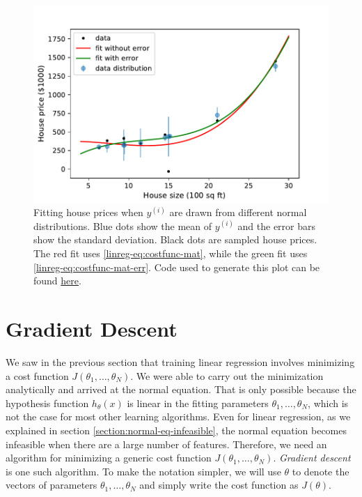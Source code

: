 \documentclass{article}
\theoremstyle{definition}
\begin{document}
\begin{figure}[ht]
\centering
\includegraphics[scale=0.7]{images/lin_reg/yerror.pdf}
\caption{Fitting house prices when $y^{(i)}$ are drawn from different normal distributions. Blue dots show the mean of $y^{(i)}$ and the error bars show the standard deviation. Black dots are sampled house prices. The red fit uses \eqref{linreg-eq:costfunc-mat}, while the green fit uses \eqref{linreg-eq:costfunc-mat-err}. Code used to generate this plot can be found \href{https://github.com/siavashaslanbeigi/ml_notes/blob/master/src/lin_reg/yerror.ipynb}{\color{blue} here}.}
\label{linreg-fig:yerror}
\end{figure}


\newpage
\section{Gradient Descent}
We saw in the previous section that training linear regression involves minimizing a cost function $J(\theta_1,\dots,\theta_N)$. We were able to carry out the minimization analytically and arrived at the normal equation. That is only possible because the hypothesis function $h_{\theta}(x)$ is linear in the fitting parameters $\theta_1,\dots,\theta_N$, which is not the case for most other learning algorithms.
Even for linear regression, as we explained in section \ref{section:normal-eq-infeasible}, the normal equation becomes infeasible when there are a large number of features. Therefore, we need an algorithm for minimizing a generic cost function $J(\theta_1,\dots,\theta_N)$. \textit{Gradient descent} is one such algorithm. To make the notation simpler, we will use $\theta$ to denote the vectors of parameters $\theta_1,\dots,\theta_N$ and simply write the cost function as $J(\theta)$.
\end{document}
